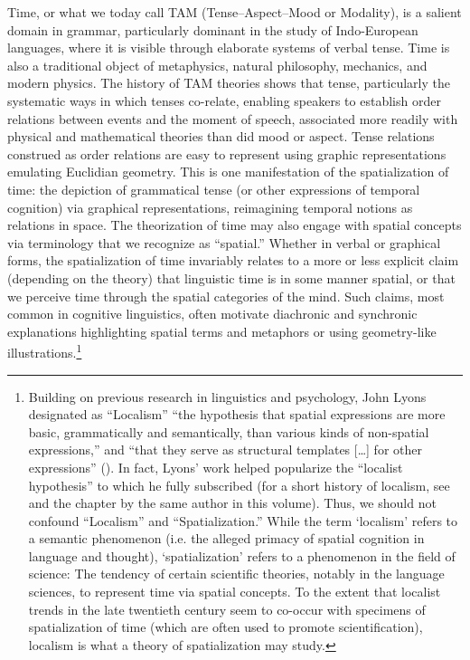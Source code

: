 \documentclass[english,output=paper,colorlinks,citecolor=brown]{../langscibook}
\begin{document}
Time, or what we today call TAM (Tense–Aspect–Mood or Modality), is a salient domain in grammar, particularly dominant in the study of Indo-European languages, where it is visible through elaborate systems of verbal tense. Time is also a traditional object of metaphysics, natural philosophy, mechanics, and modern physics. The history of TAM theories shows that tense, particularly the systematic ways in which tenses co-relate, enabling speakers to establish order relations between events and the moment of speech, associated more readily with physical and mathematical theories than did mood or aspect. Tense relations construed as order relations are easy to represent using graphic representations emulating Euclidian geometry. This is one manifestation of the spatialization of time: the depiction of grammatical tense (or other expressions of temporal cognition) via graphical representations, reimagining temporal notions as relations in space. The theorization of time may also engage with spatial concepts via terminology that we recognize as “spatial.” Whether in verbal or graphical forms, the spatialization of time invariably relates to a more or less explicit claim (depending on the theory) that linguistic time is in some manner spatial, or that we perceive time through the spatial categories of the mind. Such claims, most common in cognitive linguistics, often motivate diachronic and synchronic explanations highlighting spatial terms and metaphors or using geometry-like illustrations.\footnote{Building on previous research in linguistics and psychology, John Lyons designated as “Localism” “the hypothesis that spatial expressions are more basic, grammatically and semantically, than various kinds of non-spatial expressions,” and “that they serve as structural templates […] for other expressions” (\citeyear[718]{Lyons1977}). In fact, Lyons’ work helped popularize the “localist hypothesis” to which he fully subscribed (for a short history of localism, see \citealt{Fortis2018Anderson} and the chapter by the same author in this volume). Thus, we should not confound “Localism” and “Spatialization.” While the term ‘localism’ refers to a semantic phenomenon (i.e. the alleged primacy of spatial cognition in language and thought), ‘spatialization’ refers to a phenomenon in the field of science: The tendency of certain scientific theories, notably in the language sciences, to represent time via spatial concepts. To the extent that localist trends in the late twentieth century seem to co-occur with specimens of spatialization of time (which are often used to promote scientification), localism is what a theory of spatialization may study.}
\end{document}
